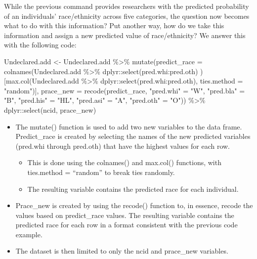 \documentclass[
]{article}
\newenvironment{Shaded}{}{}
\newcommand{\AttributeTok}[1]{#1}
\newcommand{\FunctionTok}[1]{#1}
\newcommand{\NormalTok}[1]{#1}
\newcommand{\OtherTok}[1]{\textcolor[rgb]{1.00,0.25,0.00}{#1}}
\newcommand{\SpecialCharTok}[1]{\textcolor[rgb]{0.00,0.50,0.50}{#1}}
\newcommand{\StringTok}[1]{\textcolor[rgb]{0.00,0.50,0.50}{#1}}
\providecommand{\tightlist}{%
  \setlength{\itemsep}{0pt}\setlength{\parskip}{0pt}}
\begin{document}
While the previous command provides researchers with the predicted
probability of an individuals' race/ethnicity across five categories,
the question now becomes what to do with this information? Put another
way, how do we take this information and assign a new predicted value of
race/ethnicity? We answer this with the following code:

\begin{Shaded}
\begin{Highlighting}[]
\NormalTok{Undeclared.add }\OtherTok{\textless{}{-}}\NormalTok{ Undeclared.add }\SpecialCharTok{\%\textgreater{}\%} 
  \FunctionTok{mutate}\NormalTok{(}\AttributeTok{predict\_race =} \FunctionTok{colnames}\NormalTok{(Undeclared.add }\SpecialCharTok{\%\textgreater{}\%} 
\NormalTok{         dplyr}\SpecialCharTok{::}\FunctionTok{select}\NormalTok{(pred.whi}\SpecialCharTok{:}\NormalTok{pred.oth) )[}\FunctionTok{max.col}\NormalTok{(Undeclared.add }\SpecialCharTok{\%\textgreater{}\%} 
\NormalTok{         dplyr}\SpecialCharTok{::}\FunctionTok{select}\NormalTok{(pred.whi}\SpecialCharTok{:}\NormalTok{pred.oth), }\AttributeTok{ties.method =} \StringTok{"random"}\NormalTok{)],}
         \AttributeTok{prace\_new =} \FunctionTok{recode}\NormalTok{(predict\_race, }
                      \StringTok{"pred.whi"} \OtherTok{=} \StringTok{"W"}\NormalTok{,}
                      \StringTok{"pred.bla"} \OtherTok{=} \StringTok{"B"}\NormalTok{,}
                      \StringTok{"pred.his"} \OtherTok{=} \StringTok{"HL"}\NormalTok{,}
                      \StringTok{"pred.asi"} \OtherTok{=} \StringTok{"A"}\NormalTok{,}
                      \StringTok{"pred.oth"} \OtherTok{=} \StringTok{"O"}\NormalTok{)) }\SpecialCharTok{\%\textgreater{}\%}
\NormalTok{  dplyr}\SpecialCharTok{::}\FunctionTok{select}\NormalTok{(ncid, prace\_new)}
\end{Highlighting}
\end{Shaded}

\begin{itemize}
\tightlist
\item
  The mutate() function is used to add two new variables to the data
  frame. Predict\_race is created by selecting the names of the new
  predicted variables (pred.whi through pred.oth) that have the highest
  values for each row.

  \begin{itemize}
  \tightlist
  \item
    This is done using the colnames() and max.col() functions, with
    ties.method = ``random'' to break ties randomly.
  \item
    The resulting variable contains the predicted race for each
    individual.
  \end{itemize}
\item
  Prace\_new is created by using the recode() function to, in essence,
  recode the values based on predict\_race values. The resulting
  variable contains the predicted race for each row in a format
  consistent with the previous code example.
\item
  The dataset is then limited to only the ncid and prace\_new variables.
\end{itemize}
\end{document}
